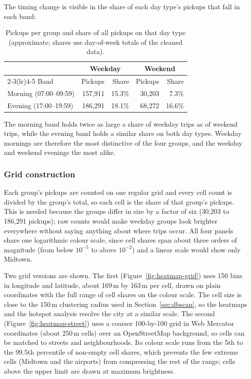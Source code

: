 \documentclass[11pt,a4paper]{article}
\begin{document}
The timing change is visible in the share of each day type's pickups that fall in each band:
\begin{table}[H]
\centering
\caption{Pickups per group and share of all pickups on that day type (approximate; shares use day-of-week totals of the cleaned data).}
\begin{tabular}{lrrrr}
\toprule
 & \multicolumn{2}{c}{Weekday} & \multicolumn{2}{c}{Weekend} \\
\cmidrule(lr){2-3}\cmidrule(lr){4-5}
Band & Pickups & Share & Pickups & Share \\
\midrule
Morning (07:00--09:59) & 157,911 & 15.3\% & 30,203 & 7.3\% \\
Evening (17:00--19:59) & 186,291 & 18.1\% & 68,272 & 16.6\% \\
\bottomrule
\end{tabular}
\label{tab:groups}
\end{table}
The morning band holds twice as large a share of weekday trips as of weekend trips, while the evening band holds a similar share on both day types. Weekday mornings are therefore the most distinctive of the four groups, and the weekday and weekend evenings the most alike.

\subsubsection{Grid construction}

Each group's pickups are counted on one regular grid and every cell count is divided by the group's total, so each cell is the share of that group's pickups. This is needed because the groups differ in size by a factor of six (30,203 to 186,291 pickups); raw counts would make weekday groups look brighter everywhere without saying anything about where trips occur. All four panels share one logarithmic colour scale, since cell shares span about three orders of magnitude (from below $10^{-5}$ to above $10^{-2}$) and a linear scale would show only Midtown.

Two grid versions are shown. The first (Figure~\ref{fig:heatmap-grid}) uses 150 bins in longitude and latitude, about 169\,m by 163\,m per cell, drawn on plain coordinates with the full range of cell shares on the colour scale. The cell size is close to the 150\,m clustering radius used in Section~\ref{sec:dbscan}, so the heatmaps and the hotspot analysis resolve the city at a similar scale. The second (Figure~\ref{fig:heatmap-street}) uses a coarser 100-by-100 grid in Web Mercator coordinates (about 250\,m cells) over an OpenStreetMap background, so cells can be matched to streets and neighbourhoods. Its colour scale runs from the 5th to the 99.5th percentile of non-empty cell shares, which prevents the few extreme cells (Midtown and the airports) from compressing the rest of the range; cells above the upper limit are drawn at maximum brightness.
\end{document}

